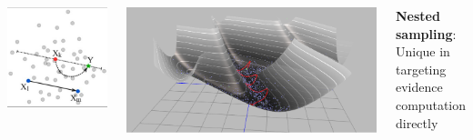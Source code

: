 \documentclass[aspectratio=169]{beamer}
\begin{document}
\begin{frame}
\begin{columns}
\begin{columns}
        \includegraphics[width=\textwidth]{figures/zeus}
        \end{columns}
        \includegraphics[width=\textwidth]{figures/hmc_explained}
        \vspace{5pt}
        \begin{center}
            \textbf{Nested sampling}: \\
            Unique in targeting \\
            evidence computation directly
        \end{center}
    \end{columns}
\end{frame}
\end{document}
